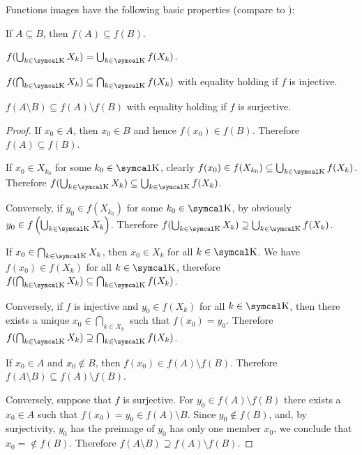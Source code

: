 \begin{proposition}\label{thm:function_image_properties}
  Functions images have the following basic properties (compare to ):
  \begin{PropEnum}
     If \( A \subseteq B \), then \( f(A) \subseteq f(B) \).

     \( f(\bigcup_{k \in \CK} X_k) = \bigcup_{k \in \CK} f(X_k) \).

     \( f(\bigcap_{k \in \CK} X_k) \subseteq \bigcap_{k \in \CK} f(X_k) \) with equality holding if \( f \) is injective.

     \( f(A \setminus B) \subseteq f(A) \setminus f(B) \) with equality holding if \( f \) is surjective.
  \end{PropEnum}
\end{proposition}
\begin{proof}
   If \( x_0 \in A \), then \( x_0 \in B \) and hence \( f(x_0) \in f(B) \). Therefore \( f(A) \subseteq f(B) \).

   If \( x_0 \in X_{k_0} \) for some \( k_0 \in \CK \), clearly \( f(x_0) \in f(X_{k_0}) \subseteq \bigcup_{k \in \CK} f(X_k) \). Therefore \( f(\bigcup_{k \in \CK} X_k) \subseteq \bigcup_{k \in \CK} f(X_k) \).

  Conversely, if \( y_0 \in f(X_{k_0}) \) for some \( k_0 \in \CK \), by  obviously \( y_0 \in f\left( \bigcup_{k \in \CK} X_k \right) \). Therefore \( f(\bigcup_{k \in \CK} X_k) \supseteq \bigcup_{k \in \CK} f(X_k) \).

   If \( x_0 \in \bigcap_{k \in \CK} X_{k} \), then \( x_0 \in X_k \) for all \( k \in \CK \). We have \( f(x_0) \in f(X_k) \) for all \( k \in \CK \), therefore \( f(\bigcap_{k \in \CK} X_k) \subseteq \bigcap_{k \in \CK} f(X_k) \).

  Conversely, if \( f \) is injective and \( y_0 \in f(X_k) \) for all \( k \in \CK \), then there exists a unique \( x_0 \in \bigcap_{k \in X_k} \) such that \( f(x_0) = y_0 \). Therefore \( f(\bigcap_{k \in \CK} X_k) \supseteq \bigcap_{k \in \CK} f(X_k) \).

   If \( x_0 \in A \) and \( x_0 \not\in B \), then \( f(x_0) \in f(A) \setminus f(B) \). Therefore \( f(A \setminus B) \subseteq f(A) \setminus f(B) \).

  Conversely, suppose that \( f \) is surjective. For \( y_0 \in f(A) \setminus f(B) \) there exists a \( x_0 \in A \) such that \( f(x_0) = y_0 \in f(A) \setminus B \). Since \( y_0 \not\in f(B) \), and, by surjectivity, \( y_0 \) has the preimage of \( y_0 \) has only one member \( x_0 \), we conclude that \( x_0 = \not\in f(B) \). Therefore \( f(A \setminus B) \supseteq f(A) \setminus f(B) \).
\end{proof}

